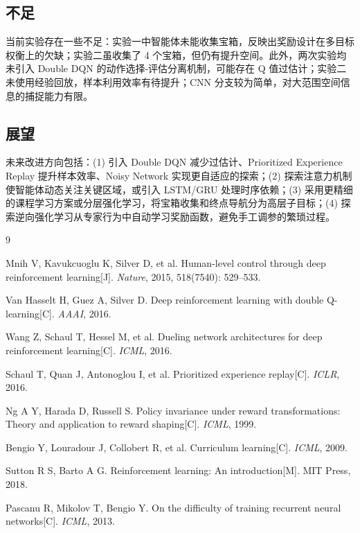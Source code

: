 \documentclass[12pt,a4paper]{article}
\begin{document}
\subsection{不足}

当前实验存在一些不足：实验一中智能体未能收集宝箱，反映出奖励设计在多目标权衡上的欠缺；实验二虽收集了 4 个宝箱，但仍有提升空间。此外，两次实验均未引入 Double DQN 的动作选择-评估分离机制，可能存在 Q 值过估计；实验二未使用经验回放，样本利用效率有待提升；CNN 分支较为简单，对大范围空间信息的捕捉能力有限。

\subsection{展望}

未来改进方向包括：(1) 引入 Double DQN 减少过估计、Prioritized Experience Replay 提升样本效率、Noisy Network 实现更自适应的探索；(2) 探索注意力机制使智能体动态关注关键区域，或引入 LSTM/GRU 处理时序依赖；(3) 采用更精细的课程学习方案或分层强化学习，将宝箱收集和终点导航分为高层子目标；(4) 探索逆向强化学习从专家行为中自动学习奖励函数，避免手工调参的繁琐过程。

\begin{thebibliography}{9}

Mnih V, Kavukcuoglu K, Silver D, et al.
Human-level control through deep reinforcement learning[J].
\textit{Nature}, 2015, 518(7540): 529--533.

Van Hasselt H, Guez A, Silver D.
Deep reinforcement learning with double Q-learning[C].
\textit{AAAI}, 2016.

Wang Z, Schaul T, Hessel M, et al.
Dueling network architectures for deep reinforcement learning[C].
\textit{ICML}, 2016.

Schaul T, Quan J, Antonoglou I, et al.
Prioritized experience replay[C].
\textit{ICLR}, 2016.

Ng A Y, Harada D, Russell S.
Policy invariance under reward transformations: Theory and application to reward shaping[C].
\textit{ICML}, 1999.

Bengio Y, Louradour J, Collobert R, et al.
Curriculum learning[C].
\textit{ICML}, 2009.

Sutton R S, Barto A G.
Reinforcement learning: An introduction[M].
MIT Press, 2018.

Pascanu R, Mikolov T, Bengio Y.
On the difficulty of training recurrent neural networks[C].
\textit{ICML}, 2013.

\end{thebibliography}
\end{document}
